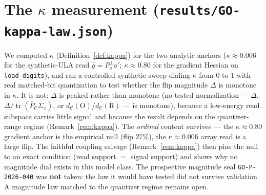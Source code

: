\documentclass[10pt]{article} %
\theoremstyle{remark}
\newcommand{\PCbar}{\bar P_{\mathcal{C}}}
\newcommand{\Sx}{\Sigma_{x}}
\newcommand{\tr}{\operatorname{tr}}
\newcommand{\kalign}{\kappa}
\newcommand{\seal}[1]{\texttt{GO-P-2026-#1}}
\begin{document}
\section{The $\kalign$ measurement (\texttt{results/GO-kappa-law.json})}\label{app:kappa}
We computed $\kalign$ (Definition~\ref{def:kappa}) for the two analytic anchors
($\kalign\approx0.006$ for the synthetic-ULA read $\hat g=P_a^\perp a'$;
$\kalign\approx0.80$ for the gradient Hessian on \texttt{load\_digits}), and ran a
controlled synthetic sweep dialing $\kalign$ from $0$ to $1$ with real matched-bit
quantization to test whether the flip magnitude $\Delta$ is monotone in $\kalign$. It is
not: $\Delta$ is peaked rather than monotone (no tested normalization ---
$\Delta$, $\Delta/\tr(\PCbar\Sx)$, or $d_{\mathcal C}(\mathrm O)/d_{\mathcal C}(\mathrm R)$
--- is monotone), because a low-energy read subspace carries little signal and because the
result depends on the quantizer-range regime (Remark~\ref{rem:kappa}). The
\emph{ordinal} content survives --- the $\kalign\approx0.80$ gradient anchor is the
empirical null (flip $27\%$), the $\kalign\approx0.006$ array read is a large flip. The
faithful coupling salvage (Remark~\ref{rem:kappa}) then pins the null to an exact
condition (read support $=$ signal support) and shows why no magnitude dial exists in this
model class. The prospective magnitude seal \seal{040} was \textbf{not} taken: the law it
would have tested did not survive validation. A magnitude law matched to the quantizer
regime remains open.
\end{document}
